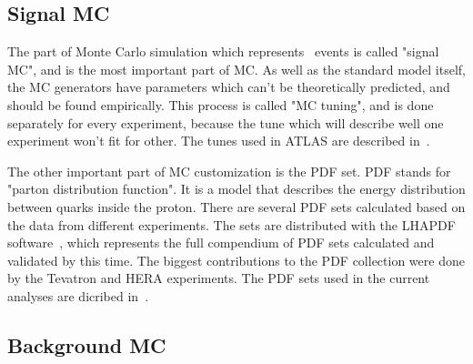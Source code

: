 \subsection{Signal MC}

The part of Monte Carlo simulation which represents \Zee\ events is called "signal MC", and is the most important part of MC. As well as the standard model itself, the MC generators have parameters which can't be theoretically predicted, and should be found empirically. This process is called "MC tuning", and is done separately for every experiment, because the tune which will describe well one experiment won't fit for other. The tunes used in ATLAS are described in~\cite{lib:MC_tune1, lib:MC_tune2}.

The other important part of MC customization is the PDF set. PDF stands for "parton distribution function". It is a model that describes the energy distribution between quarks inside the proton. There are several PDF sets calculated based on the data from different experiments. The sets are distributed with the LHAPDF software~\cite{lib:lhapdf}, which represents the full compendium of PDF sets calculated and validated by this time. The biggest contributions to the PDF collection were done by the Tevatron and HERA experiments. The PDF sets used in the current analyses are dicribed in~\cite{lib:MC_pdfct10, lib:MC_pdfcteq6l1}.

\subsection{Background MC}

